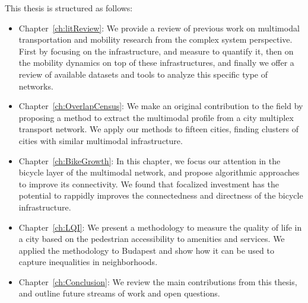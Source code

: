 This thesis is structured as follows:

\begin{itemize}
    \item Chapter~\ref{ch:litReview}: We provide a review of previous work on multimodal transportation and mobility research from the complex system perspective. First by focusing on the infrastructure, and measure to quantify it, then on the mobility dynamics on top of these infrastructures, and finally we offer a review of available datasets and tools to analyze this specific type of networks.
    \item Chapter~\ref{ch:OverlapCensus}: We make an original contribution to the field by proposing a method to extract the multimodal profile from a city multiplex transport network. We apply our methods to fifteen cities, finding clusters of cities with similar multimodal infrastructure.
    \item Chapter~\ref{ch:BikeGrowth}: In this chapter, we focus our attention in the bicycle layer of the multimodal network, and propose algorithmic approaches to improve its connectivity. We found that focalized investment has the potential to rappidly improves the connectedness and directness of the bicycle infrastructure.
    \item Chapter~\ref{ch:LQI}: We present a methodology to measure the quality of life in a city based on the pedestrian accessibility to amenities and services. We applied the methodology to Budapest and show how it can be used to capture inequalities in neighborhoods. 
    \item Chapter~\ref{ch:Conclusion}: We review the main contributions from this thesis, and outline future streams of work and open questions. 
\end{itemize}